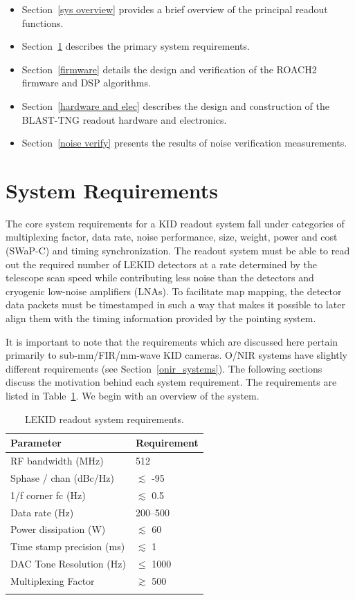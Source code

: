 \begin{itemize}[nosep]
  \item Section~\ref{sys overview} provides a brief overview of the principal readout functions.
  \item Section~\ref{sys reqs} describes the primary system requirements.
  \item Section~\ref{firmware} details the design and verification of the ROACH2 firmware and DSP algorithms.
  \item Section~\ref{hardware and elec} describes the design and construction of the BLAST-TNG readout hardware and electronics.
  \item Section~\ref{noise verify} presents the results of noise verification measurements.
\end{itemize}

\section{System Requirements}\label{sys reqs}

The core system requirements for a KID readout system fall under categories of multiplexing factor, data rate, noise performance, size, weight, power and cost (SWaP-C) and timing synchronization. The readout system must be able to read out the required number of LEKID detectors at a rate determined by the telescope scan speed while contributing less noise than the detectors and cryogenic low-noise amplifiers (LNAs). To facilitate map mapping, the detector data packets must be timestamped in such a way that makes it possible to later align them with the timing information provided by the pointing system.

It is important to note that the requirements which are discussed here pertain primarily to sub-mm/FIR/mm-wave KID cameras. O/NIR systems have slightly different requirements (see Section~\ref{onir_systems}). The following sections discuss the motivation behind each system requirement. The requirements are listed in Table~\ref{tab:sys reqs}. We begin with an overview of the system.

\begin{table}[!htbp]
\centering
\begin{tabular}{@{}ll@{}}
\dtoprule{}
Parameter & Requirement \\ \midrule
RF bandwidth (MHz) & 512 \\
\gls{Sphase} / chan (dBc/Hz) & $\lesssim$ -95 \\
1/f corner \gls{fc} (Hz) & $\lesssim$ 0.5 \\
Data rate (Hz) & 200--500 \\
Power dissipation (W) & $\lesssim$ 60 \\
Time stamp precision (ms) & $\lesssim$ 1 \\
DAC Tone Resolution (Hz) & $\leq$ 1000 \\
Multiplexing Factor & $\gtrsim$ 500 \\ \dbottomrule{}
\\
\end{tabular}
\caption{LEKID readout system requirements.}
\label{tab:sys reqs}
\end{table}


